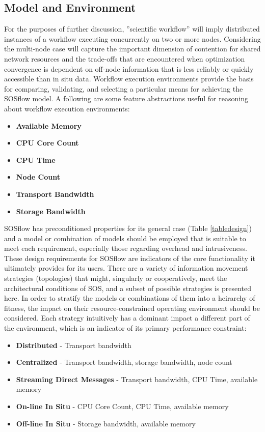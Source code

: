 \subsection{Model and Environment}
For the purposes of further discussion, ''scientific workflow'' will imply 
distributed instances of a workflow executing concurrently on two or more nodes.
%
Considering the multi-node case will capture the important dimension
of contention for shared network resources and the trade-offs that are
encountered when optimization convergence is dependent on off-node
information that is less reliably or quickly accessible than in situ
data.
%
Workflow execution environments provide the basis for comparing,
validating, and selecting a particular means for achieving the SOSflow
model.
%
A following are some feature abstractions useful for reasoning about
workflow execution environments:
%
\begin{itemize}
    \item \textbf{Available Memory}
    \item \textbf{CPU Core Count}
    \item \textbf{CPU Time}
    \item \textbf{Node Count}
    \item \textbf{Transport Bandwidth}
    \item \textbf{Storage Bandwidth}
\end{itemize}
%
SOSflow has preconditioned properties for its general case (Table
\ref{tabledesign}) and a model or combination of models should be
employed that is suitable to meet each requirement, especially those
regarding overhead and intrusiveness.
%
These design requirements for SOSflow are indicators of the core
functionality it ultimately provides for its users.
%
There are a variety of information movement strategies (topologies)
that might, singularly or cooperatively, meet the architectural
conditions of SOS, and a subset of possible strategies is presented
here.
%
In order to stratify the models or combinations of them into a
heirarchy of fitness, the impact on their resource-constrained
operating environment should be considered.
%
Each strategy intuitively has a dominant impact a different part of
the environment, which is an indicator of its primary performance
constraint:
%
%
\begin{itemize}
    \item \textbf{Distributed} - Transport bandwidth
    \item \textbf{Centralized} - Transport bandwidth, storage bandwidth, node count
    \item \textbf{Streaming Direct Messages} - Transport bandwidth, CPU Time, available memory
    \item \textbf{On-line In Situ} - CPU Core Count, CPU Time, available memory
    \item \textbf{Off-line In Situ} - Storage bandwidth, available memory
\end{itemize}
%



